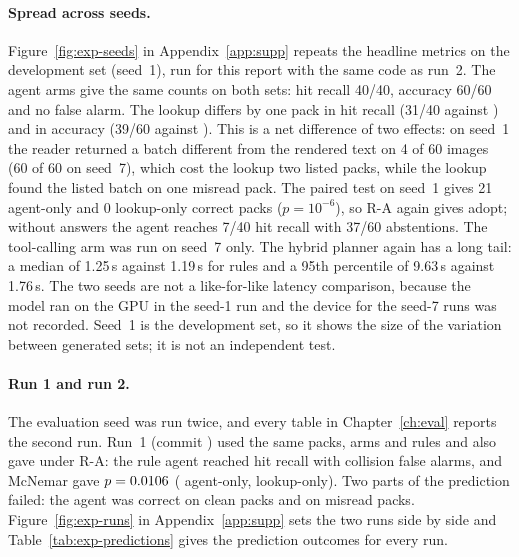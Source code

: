 \paragraph{Spread across seeds.} Figure~\ref{fig:exp-seeds} in Appendix~\ref{app:supp} repeats the headline metrics on the
development set (seed~1), run for this report with the same code as run~2. The agent arms give the
same counts on both sets: hit recall 40/40, accuracy 60/60 and no false alarm. The lookup differs by
one pack in hit recall (31/40 against ) and in accuracy (39/60 against
). This is a net difference of two effects: on seed~1 the reader
returned a batch different from the rendered text on 4 of 60 images (60 of 60 on seed~7), which
cost the lookup two listed packs, while the lookup found the listed batch on one misread pack. The paired test on seed~1 gives 21 agent-only
and 0 lookup-only correct packs ($p=10^{-6}$), so R-A again gives adopt; without answers the agent
reaches 7/40 hit recall with 37/60 abstentions. The tool-calling arm was run on seed~7 only. The hybrid planner again has a long tail: a median of
1.25\,s against 1.19\,s for rules and a 95th percentile of 9.63\,s against 1.76\,s. The two
seeds are not a like-for-like latency comparison, because the model ran on the GPU in the seed-1
run and the device for the seed-7 runs was not recorded. Seed~1 is the
development set, so it shows the size of the variation between generated sets; it is not an
independent test.

\paragraph{Run 1 and run 2.} The evaluation seed was run twice, and every table in
Chapter~\ref{ch:eval} reports the second run. Run~1 (commit \texttt{\RunOneCommit}) used the same
packs, arms and rules and also gave \RunOneRulesOracleDecision{} under R-A: the rule agent reached hit
recall \RunOneRulesOracleHitRecallK{} with \RunOneRulesOracleFARCollisionK{} collision false alarms,
and McNemar gave $p=0.0106$ (\RunOneRulesOracleMcNemarB{} agent-only,
\RunOneRulesOracleMcNemarC{} lookup-only). Two parts of the prediction failed: the agent was correct on
\RunOneRulesOracleCleanK{} clean packs and on \RunOneRulesOracleMisreadK{} misread packs.
Figure~\ref{fig:exp-runs} in Appendix~\ref{app:supp} sets the two runs side by side and Table~\ref{tab:exp-predictions} gives
the prediction outcomes for every run.

